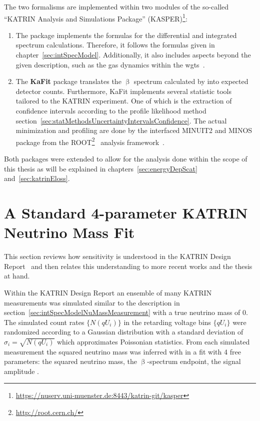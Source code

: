 The two formalisms are implemented within two modules of the so-called ``KATRIN Analysis and Simulations Package'' (KASPER)\footnote{\url{https://nuserv.uni-muenster.de:8443/katrin-git/kasper}}:
\begin{enumerate}
	\item The \textbf{} package implements the formulas for the differential and integrated spectrum calculations. Therefore, it follows the formulas given in chapter~\ref{sec:intSpecModel}. Additionally, it also includes aspects beyond the given description, such as the gas dynamics within the \gls{wgts}~\cite{Hoetzel2012, Groh2015, Kleesiek2019, Kaefer2012}.
	\item The \textbf{KaFit} package translates the $\upbeta$ spectrum calculated by  into expected detector counts. Furthermore, KaFit implements several statistic tools tailored to the KATRIN experiment. One of which is the extraction of confidence intervals according to the profile likelihood method section~\ref{sec:statMethodsUncertaintyIntervalsConfidence}. The actual minimization and profiling are done by the interfaced MINUIT2 and MINOS package from the ROOT\footnote{\url{http://root.cern.ch/}}~\cite{ANTCHEVA2009} analysis framework~\cite{Kleesiek2014}.
\end{enumerate}

Both packages were extended to allow for the analysis done within the scope of this thesis as will be explained in chapters~\ref{sec:energyDepScat} and~\ref{sec:katrinEloss}.

\section{A Standard 4-parameter KATRIN Neutrino Mass Fit}
\label{sec:statMethodsKatrinSensitivity}
This section reviews how sensitivity is understood in the KATRIN Design Report~\cite{Angrik:2005ep} and then relates this understanding to more recent works and the thesis at hand.

Within the KATRIN Design Report an ensemble of many KATRIN measurements was simulated similar to the description in section~\ref{sec:intSpecModelNuMassMeasurement} with a true neutrino mass of 0. The simulated count rates $\{N(qU_i)\}$ in the retarding voltage bins $\{qU_i\}$ were randomized according to a Gaussian distribution with a standard deviation of $\sigma_i=\sqrt{N(qU_i)}$ which approximates Poissonian statistics. From each simulated measurement the squared neutrino mass was inferred with in a fit with 4 free parameters: the squared neutrino mass, the $\upbeta$-spectrum endpoint, the signal amplitude .

